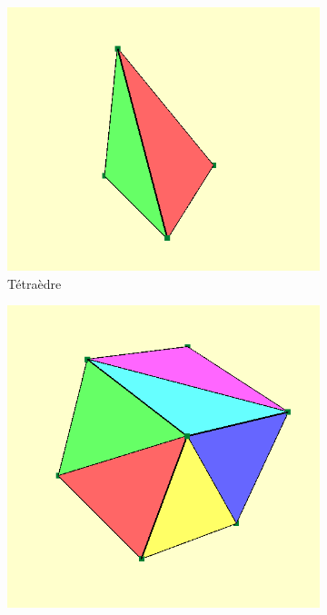 \documentclass[12pt,a4paper,twoside]{report}
\begin{document}
\begin{figure}[H]
	\centering
	\begin{subfigure}{.45\textwidth}
		\centering
		\includegraphics[width=\textwidth]{plain_tetraedre.png}
		\caption{Tétraèdre}
	\end{subfigure}
	\begin{subfigure}{.45\textwidth}
		\centering
		\includegraphics[width=\textwidth]{plain_cube.png}

\end{subfigure}
\end{figure}
\end{document}
